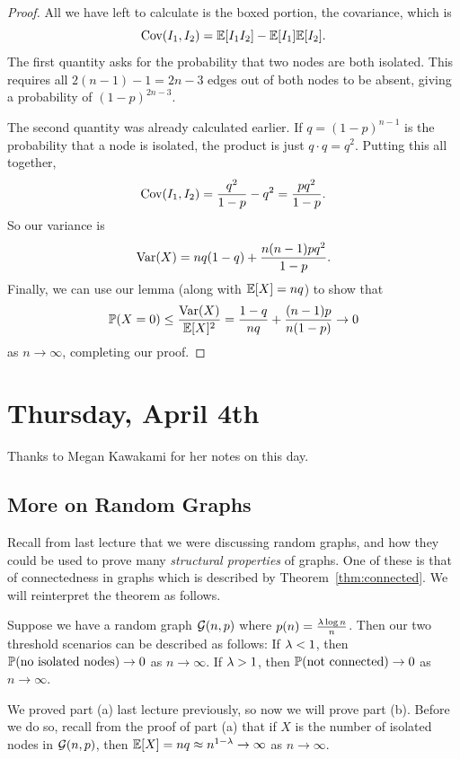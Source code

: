 \documentclass[11 pt]{scrartcl}
\begin{document}
\begin{proof}
    All we have left to calculate is the boxed portion, the covariance, which is 
\[ \text{Cov}(I_1, I_2) = \mathbb E[I_1I_2] - \mathbb E[I_1]\mathbb E[I_2].\] 
The first quantity asks for the probability that two nodes are both isolated. This requires all $2(n-1)-1 = 2n-3$ edges out of both nodes to be absent, giving a probability of $(1-p)^{2n-3}$. 

The second quantity was already calculated earlier. If $q = (1-p)^{n-1}$ is the probability that a node is isolated, the product is just $q\cdot q = q^2$. Putting this all together, 
    \[\text{Cov}(I_1, I_2) = \frac{q^2}{1-p} - q^2 = \dfrac{pq^2}{1-p}.\] 
    So our variance is 
    \[ \text{Var}(X) = nq(1-q) + \dfrac{n(n-1)pq^2}{1-p}.\] 
    Finally, we can use our lemma (along with $\mathbb E[X] = nq$) to show that 
    \[ \mathbb P(X = 0) \leq \dfrac{\text{Var}(X)}{\mathbb E[X]^2} = \dfrac{1-q}{nq} + \dfrac{(n-1)p}{n(1-p)} \to 0\] 
    as $n\to \infty$, completing our proof. 
\end{proof}

\newpage
\section{Thursday, April 4th}
Thanks to Megan Kawakami for her notes on this day. 

\subsection{More on Random Graphs}
Recall from last lecture that we were discussing random graphs, and how they could be used to prove many \emph{structural properties} of graphs. One of these is that of connectedness in graphs which is described by Theorem~\ref{thm:connected}. We will reinterpret the theorem as follows. 

Suppose we have a random graph $\mathcal G(n, p)$ where $p(n) = \frac{\lambda\log n}{n}$. Then our two threshold scenarios can be described as follows: 
\alphanum
    \ii If $\lambda < 1$, then $\mathbb P(\text{no isolated nodes}) \to 0$ as $n\to\infty$.
    \ii If $\lambda > 1$, then $\mathbb P(\text{not connected}) \to 0$ as $n\to\infty$. 
\enumend

We proved part (a) last lecture previously, so now we will prove part (b). Before we do so, recall from the proof of part (a) that if $X$ is the number of isolated nodes in $\mathcal G(n, p)$, then $\mathbb E[X] = nq \approx n^{1-\lambda} \to \infty$ as $n\to\infty$. 
\end{document}
